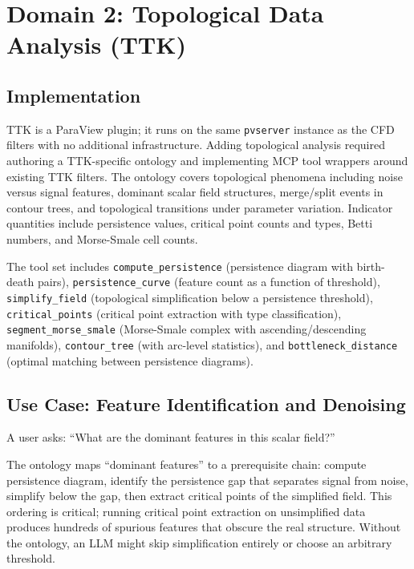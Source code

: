 \documentclass{vgtc}                          %
\begin{document}
\section{Domain 2: Topological Data Analysis (TTK)}
\label{sec:ttk}

\subsection{Implementation}

TTK is a ParaView plugin; it runs on the same \texttt{pvserver} instance as
the CFD filters with no additional infrastructure.
Adding topological analysis required authoring a TTK-specific ontology and
implementing MCP tool wrappers around existing TTK filters.
The ontology covers topological phenomena including noise versus signal
features, dominant scalar field structures, merge/split events in contour
trees, and topological transitions under parameter variation.
Indicator quantities include persistence values, critical point counts and
types, Betti numbers, and Morse-Smale cell counts.

The tool set includes
\texttt{compute\_persistence} (persistence diagram with birth-death pairs),
\texttt{persistence\_curve} (feature count as a function of threshold),
\texttt{simplify\_field} (topological simplification below a persistence
threshold),
\texttt{critical\_points} (critical point extraction with type
classification),
\texttt{segment\_morse\_smale} (Morse-Smale complex with ascending/descending
manifolds),
\texttt{contour\_tree} (with arc-level statistics),
and \texttt{bottleneck\_distance} (optimal matching between persistence
diagrams).


\subsection{Use Case: Feature Identification and Denoising}

A user asks: ``What are the dominant features in this scalar field?''

The ontology maps ``dominant features'' to a prerequisite chain: compute
persistence diagram, identify the persistence gap that separates signal from
noise, simplify below the gap, then extract critical points of the simplified
field.
This ordering is critical; running critical point extraction on unsimplified
data produces hundreds of spurious features that obscure the real structure.
Without the ontology, an LLM might skip simplification entirely or choose an
arbitrary threshold.
\end{document}
